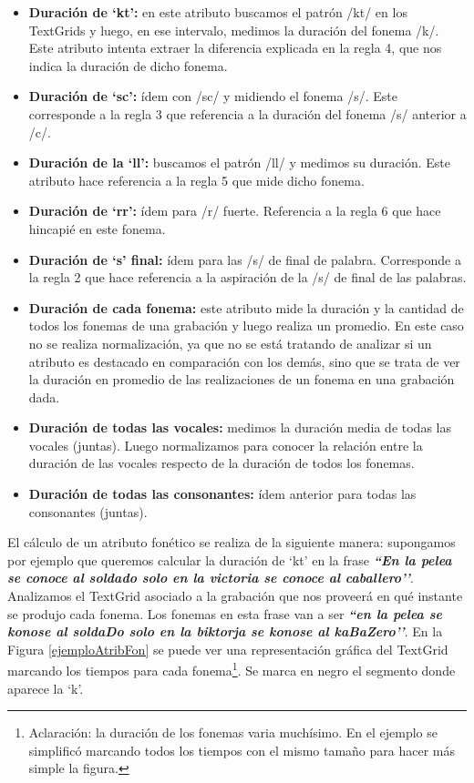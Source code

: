 \begin{itemize}
    \item \textbf{Duración de `kt’:} en este atributo buscamos el patrón /kt/ en los TextGrids y luego, en ese intervalo, medimos la duración del fonema /k/. Este atributo intenta extraer la diferencia explicada en la regla 4, que nos indica la duración de dicho fonema.
    \item \textbf{Duración de `sc’:} ídem con /sc/ y midiendo el fonema /s/. Este corresponde a la regla 3 que referencia a la duración del fonema /s/ anterior a /c/.  
    \item \textbf{Duración de la `ll’:} buscamos el patrón /ll/ y medimos su duración. Este atributo hace referencia a la regla 5 que mide dicho fonema.
    \item \textbf{Duración de `rr’:} ídem para /r/ fuerte. Referencia a la regla 6 que hace hincapié en este fonema.
    \item \textbf{Duración de `s’ final:} ídem para las /s/ de final de palabra. Corresponde a la regla 2 que hace referencia a la aspiración de la /s/ de final de las palabras.  
    \item \textbf{Duración de cada fonema:} este atributo mide la duración y la cantidad de todos los fonemas de una grabación y luego realiza un promedio. En este caso no se realiza normalización, ya que no se está tratando de analizar si un atributo es destacado en comparación con los demás, sino que se trata de ver la duración en promedio de las realizaciones de un fonema en una grabación dada.
    \item \textbf{Duración de todas las vocales:} medimos la duración media de todas las vocales (juntas). Luego normalizamos para conocer la relación entre la duración de las vocales respecto de la duración de todos los fonemas.
    \item \textbf{Duración de todas las consonantes:} ídem anterior para todas las consonantes (juntas). 
\end{itemize}

El cálculo de un atributo fonético se realiza de la siguiente manera: supongamos por ejemplo que queremos calcular la duración de `kt’ en la frase \textbf{\textit{``En la pelea se conoce al soldado solo en la victoria se conoce al caballero’’}}. Analizamos el TextGrid asociado a la grabación que nos proveerá en qué instante se produjo cada fonema. Los fonemas en esta frase van a ser \textbf{\textit{``en la pelea se konose al soldaDo solo en la biktorja se konose al kaBaZero’’}}. En la Figura \ref{ejemploAtribFon} se puede ver una representación gráfica del TextGrid marcando los tiempos para cada fonema\footnote{Aclaración: la duración de los fonemas varia muchísimo. En el ejemplo se simplificó marcando todos los tiempos con el mismo tamaño para hacer más simple la figura.}. Se marca en negro el segmento donde aparece la `k’.

